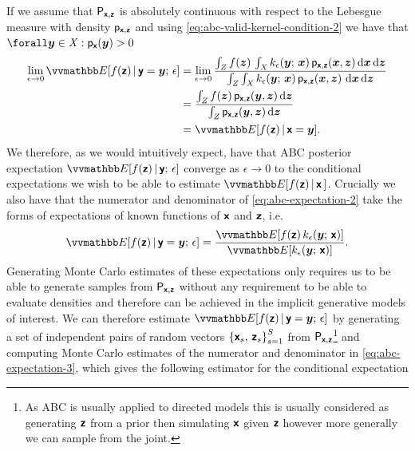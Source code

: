 If we assume that $\mathsf{P}_{\boldsymbol{\mathsf{x}},\boldsymbol{\mathsf{z}}}$ is absolutely continuous with respect to the Lebesgue measure with density $\mathsf{p}_{\boldsymbol{\mathsf{x}},\boldsymbol{\mathsf{z}}}$ and using \eqref{eq:abc-valid-kernel-condition-2} we have that $\forall \vct{y} \in \set{X} : \pden{\rvct{x}}(\vct{y}) > 0$
\begin{align}\label{eq:abc-expectation-limit}
  \lim_{\epsilon \to 0}
  \expc{f(\rvct{z}) \gvn \rvct{y} = \vct{y};\,\epsilon} &=
  \lim_{\epsilon \to 0}
  \frac{
  \int_{\set{Z}} f(\vct{z})\, \int_{\set{X}}
    k_{\epsilon}(\vct{y};\,\vct{x})\,
    \pden{\rvct{x},\rvct{z}}(\vct{x},\vct{z})
  \,\dr\vct{x}\,\dr\vct{z}
  }
  {
   \int_{\set{Z}}\int_{\set{X}}
    k_\epsilon(\vct{y};\,\vct{x})\,\pden{\rvct{x},\rvct{z}}(\vct{x},\vct{z})\,
  \,\dr\vct{x}\,\dr\vct{z}
  }\\
  &=
  \frac{
  \int_{\set{Z}}
    f(\vct{z})\,\pden{\rvct{x},\rvct{z}}(\vct{y},\vct{z})
  \,\dr\vct{z}}
  {\int_{\set{Z}}\pden{\rvct{x},\rvct{z}}(\vct{y},\vct{z})\,\dr\vct{z}}\\
  &=
  \expc{f(\rvct{z}) \gvn \rvct{x} = \vct{y}}.
\end{align}
We therefore, as we would intuitively expect, have that \ac{ABC} posterior expectation $\expc{f(\rvct{z}) \gvn \rvct{y};\,\epsilon}$ converge as $\epsilon \to 0$ to the conditional expectations we wish to be able to estimate $\expc{f(\rvct{z}) \gvn \rvct{x}\,}$. Crucially we also have that the numerator and denominator of \eqref{eq:abc-expectation-2} take the forms of expectations of known functions of $\boldsymbol{\mathsf{x}}$ and $\boldsymbol{\mathsf{z}}$, i.e.
\begin{equation}
  \label{eq:abc-expectation-3}
  \expc{f(\rvct{z}) \gvn \rvct{y} = \vct{y};\,\epsilon} 
  =
  \frac{
    \expc{f(\rvct{z})\,k_{\epsilon}(\vct{y};\,\rvct{x})}
  }
  {
    \expc{k_\epsilon(\vct{y};\,\rvct{x})}
  }.
\end{equation}
Generating Monte Carlo estimates of these expectations only requires us to be able to generate samples from $\mathsf{P}_{\boldsymbol{\mathsf{x}},\boldsymbol{\mathsf{z}}}$ without any requirement to be able to evaluate densities and therefore can be achieved in the implicit generative models of interest. We can therefore estimate $\expc{f(\rvct{z}) \gvn \rvct{y} = \vct{y};\,\epsilon}$ by generating a set of independent pairs of random vectors $\lbr \rvct{x}_s,\,\rvct{z}_s \rbr_{s=1}^S$ from $\mathsf{P}_{\boldsymbol{\mathsf{x}},\boldsymbol{\mathsf{z}}}$\footnote{As \ac{ABC} is usually applied to directed models this is usually considered as generating $\boldsymbol{\mathsf{z}}$ from a prior then simulating $\boldsymbol{\mathsf{x}}$ given $\boldsymbol{\mathsf{z}}$ however more generally we can sample from the joint.} and computing Monte Carlo estimates of the numerator and denominator in \eqref{eq:abc-expectation-3}, which gives the following estimator for the conditional expectation
